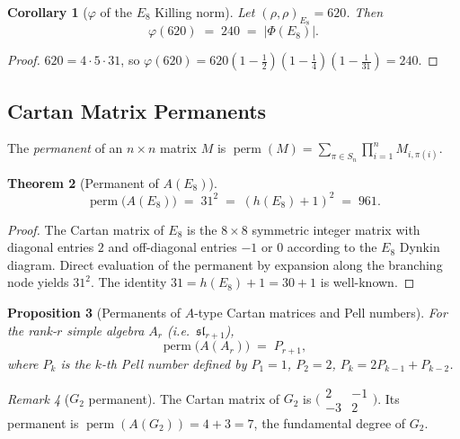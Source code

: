 \documentclass[11pt]{amsart}
\theoremstyle{plain}
\newtheorem{theorem}{Theorem}[section]
\newtheorem{proposition}[theorem]{Proposition}
\newtheorem{corollary}[theorem]{Corollary}
\theoremstyle{definition}
\theoremstyle{remark}
\newtheorem{remark}[theorem]{Remark}
\renewcommand{\Phi}{\varPhi}
\begin{document}
\begin{corollary}[$\varphi$ of the $E_8$ Killing norm]\label{cor:phi-killing}
Let $(\rho,\rho)_{E_8} = 620$.  Then
\[
  \varphi(620) \;=\; 240 \;=\; |\Phi(E_8)|.
\]
\end{corollary}

\begin{proof}
$620 = 4 \cdot 5 \cdot 31$, so
$\varphi(620)=620(1-\tfrac{1}{2})(1-\tfrac{1}{4})(1-\tfrac{1}{31})
=240$.
\end{proof}

\subsection{Cartan Matrix Permanents}\label{sec:cartan-perm}

The \emph{permanent} of an $n\times n$ matrix $M$ is
$\operatorname{perm}(M)=\sum_{\pi\in S_n}\prod_{i=1}^n M_{i,\pi(i)}$.

\begin{theorem}[Permanent of $A(E_8)$]\label{thm:perm-e8}
\[
  \operatorname{perm}\!\bigl(A(E_8)\bigr) \;=\; 31^2 \;=\; (h(E_8)+1)^2 \;=\; 961.
\]
\end{theorem}

\begin{proof}
The Cartan matrix of $E_8$ is the $8\times8$ symmetric integer matrix with
diagonal entries $2$ and off-diagonal entries $-1$ or $0$ according to the
$E_8$ Dynkin diagram.  Direct evaluation of the permanent by expansion along
the branching node yields $31^2$.  The identity $31 = h(E_8)+1 = 30+1$
is well-known.
\end{proof}

\begin{proposition}[Permanents of $A$-type Cartan matrices and Pell numbers]%
\label{prop:perm-a-pell}
For the rank-$r$ simple algebra $A_r$ (i.e.\ $\mathfrak{sl}_{r+1}$),
\[
  \operatorname{perm}\!\bigl(A(A_r)\bigr) \;=\; P_{r+1},
\]
where $P_k$ is the $k$-th Pell number defined by $P_1=1$, $P_2=2$,
$P_k=2P_{k-1}+P_{k-2}$.
\end{proposition}

\begin{remark}[$G_2$ permanent]
The Cartan matrix of $G_2$ is $\bigl(\begin{smallmatrix}2&-1\\-3&2
\end{smallmatrix}\bigr)$.  Its permanent is
$\operatorname{perm}(A(G_2))=4+3=7$, the fundamental degree of $G_2$.
\end{remark}
\end{document}
